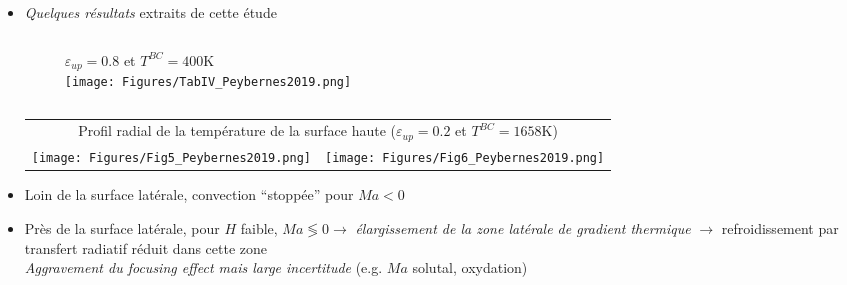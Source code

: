 \begin{frame}[fragile]
\begin{itemize}
\item \emph{Quelques résultats} extraits de cette étude \cite{Peybernes2019}
\begin{columns}[T]
    \begin{column}{0.6\textwidth}
\begin{figure}[H]
\centering 
{\scriptsize $\varepsilon_{up}=0.8$ et $T^{BC}=400$K} \\
\texttt{[image: Figures/TabIV\_Peybernes2019.png]}
\end{figure}
    \end{column}
    \end{columns}
\begin{tabular}{cc}
\multicolumn{2}{c}{\scriptsize Profil radial de la température de la surface haute ($\varepsilon_{up}=0.2$ et $T^{BC}=1658$K)} \\
\texttt{[image: Figures/Fig5\_Peybernes2019.png]} & \texttt{[image: Figures/Fig6\_Peybernes2019.png]}
\end{tabular}
\item Loin de la surface latérale, convection ``stoppée'' pour $Ma<0$
\item Près de la surface latérale, pour $H$ faible, $Ma\lessgtr 0 \rightarrow$ \emph{élargissement de la zone latérale de gradient thermique} $\rightarrow$ refroidissement par transfert radiatif réduit dans cette zone \\
\emph{Aggravement du focusing effect mais large incertitude} (e.g. $Ma$ solutal, oxydation)
\end{itemize}
\end{frame}

